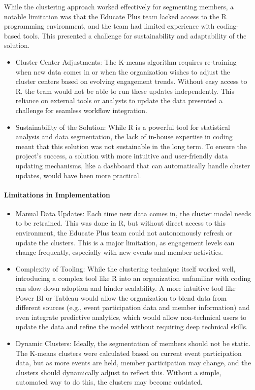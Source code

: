 \documentclass[11pt,a4paper,]{article}
\begin{document}
While the clustering approach worked effectively for segmenting members, a notable limitation was that the Educate Plus team lacked access to the R programming environment, and the team had limited experience with coding-based tools. This presented a challenge for sustainability and adaptability of the solution.

\begin{itemize}
\item
  Cluster Center Adjustments: The K-means algorithm requires re-training when new data comes in or when the organization wishes to adjust the cluster centers based on evolving engagement trends. Without easy access to R, the team would not be able to run these updates independently. This reliance on external tools or analysts to update the data presented a challenge for seamless workflow integration.
\item
  Sustainability of the Solution: While R is a powerful tool for statistical analysis and data segmentation, the lack of in-house expertise in coding meant that this solution was not sustainable in the long term. To ensure the project's success, a solution with more intuitive and user-friendly data updating mechanisms, like a dashboard that can automatically handle cluster updates, would have been more practical.
\end{itemize}

\paragraph{Limitations in Implementation}\label{limitations-in-implementation}

\begin{itemize}
\item
  Manual Data Updates: Each time new data comes in, the cluster model needs to be retrained. This was done in R, but without direct access to this environment, the Educate Plus team could not autonomously refresh or update the clusters. This is a major limitation, as engagement levels can change frequently, especially with new events and member activities.
\item
  Complexity of Tooling: While the clustering technique itself worked well, introducing a complex tool like R into an organization unfamiliar with coding can slow down adoption and hinder scalability. A more intuitive tool like Power BI or Tableau would allow the organization to blend data from different sources (e.g., event participation data and member information) and even integrate predictive analytics, which would allow non-technical users to update the data and refine the model without requiring deep technical skills.
\item
  Dynamic Clusters: Ideally, the segmentation of members should not be static. The K-means clusters were calculated based on current event participation data, but as more events are held, member participation may change, and the clusters should dynamically adjust to reflect this. Without a simple, automated way to do this, the clusters may become outdated.
\end{itemize}
\end{document}
